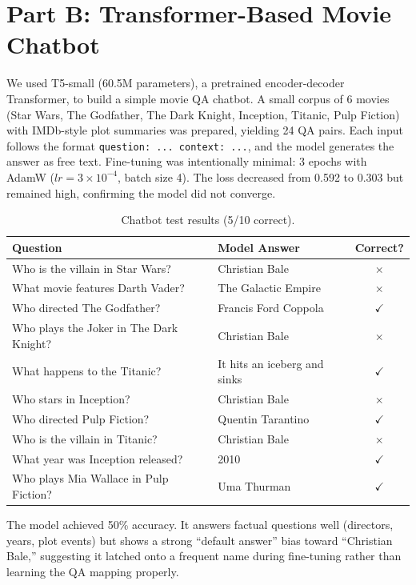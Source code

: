 \documentclass[11pt,a4paper]{article}
\begin{document}
\section{Part B: Transformer-Based Movie Chatbot}

We used T5-small (60.5M parameters), a pretrained encoder-decoder Transformer, to build a simple movie QA chatbot. A small corpus of 6 movies (Star Wars, The Godfather, The Dark Knight, Inception, Titanic, Pulp Fiction) with IMDb-style plot summaries was prepared, yielding 24 QA pairs. Each input follows the format \texttt{question: ... context: ...}, and the model generates the answer as free text. Fine-tuning was intentionally minimal: 3 epochs with AdamW ($lr = 3 \times 10^{-4}$, batch size 4). The loss decreased from 0.592 to 0.303 but remained high, confirming the model did not converge.

\begin{table}[H]
\centering
\begin{tabular}{p{6.5cm}p{4cm}c}
\toprule
\textbf{Question} & \textbf{Model Answer} & \textbf{Correct?} \\
\midrule
Who is the villain in Star Wars? & Christian Bale & $\times$ \\
What movie features Darth Vader? & The Galactic Empire & $\times$ \\
Who directed The Godfather? & Francis Ford Coppola & $\checkmark$ \\
Who plays the Joker in The Dark Knight? & Christian Bale & $\times$ \\
What happens to the Titanic? & It hits an iceberg and sinks & $\checkmark$ \\
Who stars in Inception? & Christian Bale & $\times$ \\
Who directed Pulp Fiction? & Quentin Tarantino & $\checkmark$ \\
Who is the villain in Titanic? & Christian Bale & $\times$ \\
What year was Inception released? & 2010 & $\checkmark$ \\
Who plays Mia Wallace in Pulp Fiction? & Uma Thurman & $\checkmark$ \\
\bottomrule
\end{tabular}
\caption{Chatbot test results (5/10 correct).}
\end{table}

The model achieved 50\% accuracy. It answers factual questions well (directors, years, plot events) but shows a strong ``default answer'' bias toward ``Christian Bale,'' suggesting it latched onto a frequent name during fine-tuning rather than learning the QA mapping properly.
\end{document}
